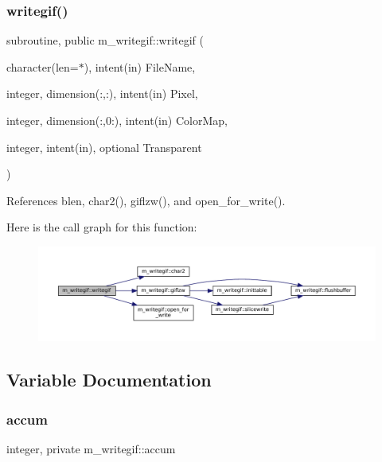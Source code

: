 \subsubsection{\texorpdfstring{writegif()}{writegif()}}
{\footnotesize\ttfamily subroutine, public m\+\_\+writegif\+::writegif (\begin{DoxyParamCaption}\item[{character(len=$\ast$), intent(in)}]{File\+Name,  }\item[{integer, dimension(\+:,\+:), intent(in)}]{Pixel,  }\item[{integer, dimension(\+:,0\+:), intent(in)}]{Color\+Map,  }\item[{integer, intent(in), optional}]{Transparent }\end{DoxyParamCaption})}



References blen, char2(), giflzw(), and open\+\_\+for\+\_\+write().

Here is the call graph for this function\+:\nopagebreak
\begin{figure}[H]
\begin{center}
\leavevmode
\includegraphics[width=350pt]{namespacem__writegif_a02be37849028b2f9484cff1b4285375d_cgraph}
\end{center}
\end{figure}


\subsection{Variable Documentation}
\mbox{\label{namespacem__writegif_a2a80a14e30c6ed2b0003d46a93480531}} 
\subsubsection{\texorpdfstring{accum}{accum}}
{\footnotesize\ttfamily integer, private m\+\_\+writegif\+::accum\hspace{0.3cm}{\ttfamily [private]}}

